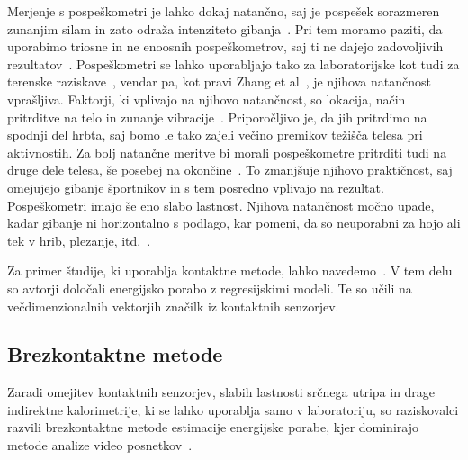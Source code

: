 Merjenje s pospeškometri je lahko dokaj natančno, saj je pospešek sorazmeren zunanjim silam in zato odraža intenziteto gibanja~\cite{yang2010review}. Pri tem moramo paziti, da uporabimo triosne in ne enoosnih pospeškometrov, saj ti ne dajejo zadovoljivih rezultatov~\cite{levine2005measurement}. Pospeškometri se lahko uporabljajo tako za laboratorijske kot tudi za terenske raziskave~\cite{yang2014sleep}, vendar pa, kot pravi Zhang et al~\cite{zhang2004improving}, je njihova natančnost vprašljiva. Faktorji, ki vplivajo na njihovo natančnost, so lokacija, način pritrditve na telo in zunanje vibracije~\cite{yang2010review}. Priporočljivo je, da jih pritrdimo na spodnji del hrbta, saj bomo le tako zajeli večino premikov težišča telesa pri aktivnostih. Za bolj natančne meritve bi morali pospeškometre pritrditi tudi na druge dele telesa, še posebej na okončine~\cite{yang2010review}. To zmanjšuje njihovo praktičnost, saj omejujejo gibanje športnikov in s tem posredno vplivajo na rezultat. Pospeškometri imajo še eno slabo lastnost. Njihova natančnost močno upade, kadar gibanje ni horizontalno s podlago, kar pomeni, da so neuporabni za hojo ali tek v hrib, plezanje, itd.~\cite{yang2010review}.

Za primer študije, ki uporablja kontaktne metode, lahko navedemo~\cite{gjoreski2015context}. V tem delu so avtorji določali energijsko porabo z regresijskimi modeli. Te so učili na večdimenzionalnih vektorjih značilk iz kontaktnih senzorjev.





\subsection{Brezkontaktne metode}

Zaradi omejitev kontaktnih senzorjev, slabih lastnosti srčnega utripa in drage indirektne kalorimetrije, ki se lahko uporablja samo v laboratoriju, so raziskovalci razvili brezkontaktne metode estimacije energijske porabe, kjer dominirajo metode analize video posnetkov~\cite{botton2011energy,osgnach2010energy,silva2015assessing,peker2004framework,nathan2015estimating}. 

